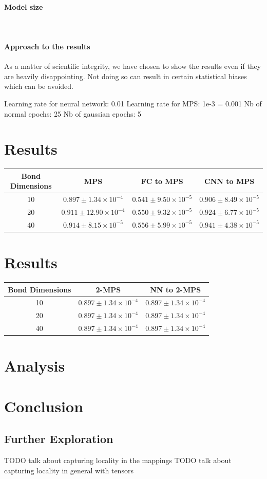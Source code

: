 \documentclass{article}
\theoremstyle{definition}
\theoremstyle{definition}
\begin{document}
\paragraph{Model size} ${}$ \\

\paragraph{Approach to the results}
As a matter of scientific integrity, we have chosen to show the 
results even if they are heavily disappointing. Not doing so 
can result in certain statistical biases which can be avoided.

Learning rate for neural network: 0.01
Learning rate for MPS: 1e-3 = 0.001
Nb of normal epochs: 25
Nb of gaussian epochs: 5


\section{Results}
\begin{tabular}{ | c | c | c | c |  }
\hline 
Bond Dimensions & MPS & FC to MPS & CNN to MPS \\ 
\hline
10 & $0.897 \pm 1.34 \times 10^{-4}$  & $0.541 \pm 9.50 \times 10^{-5}$ & $0.906 \pm 8.49 \times 10^{-5}$ \\
20 & $0.911 \pm 12.90 \times 10^{-4}$ & $0.550 \pm 9.32 \times 10^{-5}$ & $0.924 \pm 6.77 \times 10^{-5}$ \\ 
40 & $0.914 \pm 8.15 \times 10^{-5}$ & $0.556 \pm 5.99 \times 10^{-5}$ & $0.941 \pm 4.38 \times 10^{-5}$ \\
\hline
\end{tabular}

\section{Results}
\begin{tabular}{| c | c | c | }
\hline 
Bond Dimensions & 2-MPS & NN to 2-MPS \\ 
\hline
10 & $0.897 \pm 1.34 \times 10^{-4}$ & $0.897 \pm 1.34 \times 10^{-4}$ \\
20 & $0.897 \pm 1.34 \times 10^{-4}$ & $0.897 \pm 1.34 \times 10^{-4}$ \\
40 & $0.897 \pm 1.34 \times 10^{-4}$ & $0.897 \pm 1.34 \times 10^{-4}$ \\
\hline
\end{tabular}

\section{Analysis}



\section{Conclusion}



\subsection{Further Exploration}
TODO talk about capturing locality in the mappings
TODO talk about capturing locality in general with tensors

\printbibliography
\end{document}
